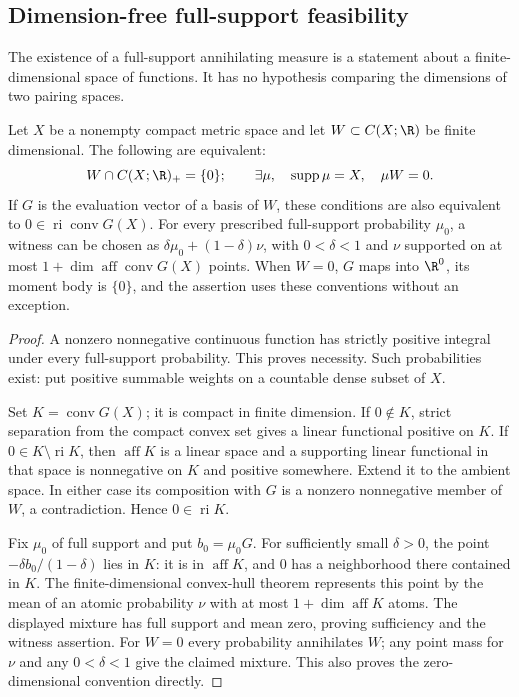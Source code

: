 \subsection{Dimension-free full-support feasibility}
\label{sec:kernel-feasibility}
The existence of a full-support annihilating measure is a statement
about a finite-dimensional space of functions. It has no hypothesis
comparing the dimensions of two pairing spaces.

\begin{lemma}
\label{lem:dimension-free-feasibility}
Let $X$ be a nonempty compact metric space and let $W\subset C(X;\R)$
be finite dimensional. The following are equivalent:
\[
 W\cap C(X;\R)_+=\{0\};\qquad
 \exists\mu,\quad\operatorname{supp}\mu=X,\quad\mu W=0.
\]
If $G$ is the evaluation vector of a basis of $W$, these conditions
are also equivalent to $0\in\operatorname{ri}\operatorname{conv}G(X)$.
For every prescribed full-support probability $\mu_0$, a witness can
be chosen as $\delta\mu_0+(1-\delta)\nu$, with $0<\delta<1$ and
$\nu$ supported on at most $1+\dim\operatorname{aff}\operatorname{conv}G(X)$
points. When $W=0$, $G$ maps into $\R^0$, its moment body is $\{0\}$,
and the assertion uses these conventions without an exception.
\end{lemma}
\begin{proof}
A nonzero nonnegative continuous function has strictly positive integral
under every full-support probability. This proves necessity. Such
probabilities exist: put positive summable weights on a countable dense
subset of $X$.

Set $K=\operatorname{conv}G(X)$; it is compact in finite dimension.
If $0\notin K$, strict separation from the compact convex set gives a
linear functional positive on $K$. If $0\in K\setminus\operatorname{ri}K$,
then $\operatorname{aff}K$ is a linear space and a supporting linear
functional in that space is nonnegative on $K$ and positive somewhere.
Extend it to the ambient space. In either case its composition with $G$
is a nonzero nonnegative member of $W$, a contradiction. Hence
$0\in\operatorname{ri}K$.

Fix $\mu_0$ of full support and put $b_0=\mu_0G$. For sufficiently
small $\delta>0$, the point $-\delta b_0/(1-\delta)$ lies in $K$:
it is in $\operatorname{aff}K$, and $0$ has a neighborhood there
contained in $K$. The finite-dimensional convex-hull theorem represents
this point by the mean of an atomic probability $\nu$ with at most
$1+\dim\operatorname{aff}K$ atoms. The displayed mixture has full
support and mean zero, proving sufficiency and the witness assertion.
For $W=0$ every probability annihilates $W$; any point mass for $\nu$
and any $0<\delta<1$ give the claimed mixture. This also proves the
zero-dimensional convention directly.
\end{proof}


